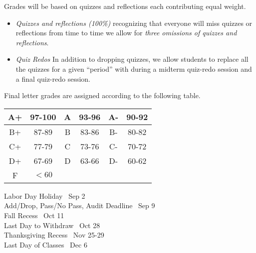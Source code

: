 \documentclass[11pt, letterpaper]{article}
\theoremstyle{definition}
\theoremstyle{remark}
\begin{document}
Grades will be based on quizzes and reflections each contributing equal weight.
\begin{itemize}
\item {\em Quizzes and reflections (100\%)} recognizing that everyone will miss quizzes or reflections from time to time we allow for \emph{three omissions of quizzes and reflections}. 
\item {\em Quiz Redos } 
In addition to dropping quizzes, we allow students to replace all the quizzes for a given ``period'' with during a midterm quiz-redo session and a final quiz-redo session. 
\end{itemize}

\noindent Final letter grades are assigned according to the following table.
\begin{center}
	\begin{tabular}{ |c|c|c|c|c|c| }
		\hline
		A+ & 97-100 & A & 93-96 & A- & 90-92 \\ 
		\hline
		B+ & 87-89 & B & 83-86 & B- & 80-82 \\ 
		\hline
		C+ & 77-79 & C & 73-76 & C- & 70-72 \\ 
		\hline
		D+ & 67-69 & D & 63-66 & D- & 60-62 \\ 
		\hline
		F & $< 60$ &&&& \\
		\hline 
	\end{tabular}
\end{center}
\vspace{1em}




\begin{center} 
	\begin{minipage}{3.8in}
		\begin{flushleft}
			Labor Day Holiday \dotfill ~Sep 2 \\
			Add/Drop, Pass/No Pass, Audit Deadline \dotfill ~Sep 9 \\
			Fall Recess \dotfill ~Oct 11 \\
			Last Day to Withdraw \dotfill ~Oct 28 \\
			Thanksgiving Recess \dotfill ~Nov 25-29 \\
			Last Day of Classes \dotfill ~Dec 6 \\
		\end{flushleft}
	\end{minipage}
\end{center}
\vspace{1em}
\end{document}

